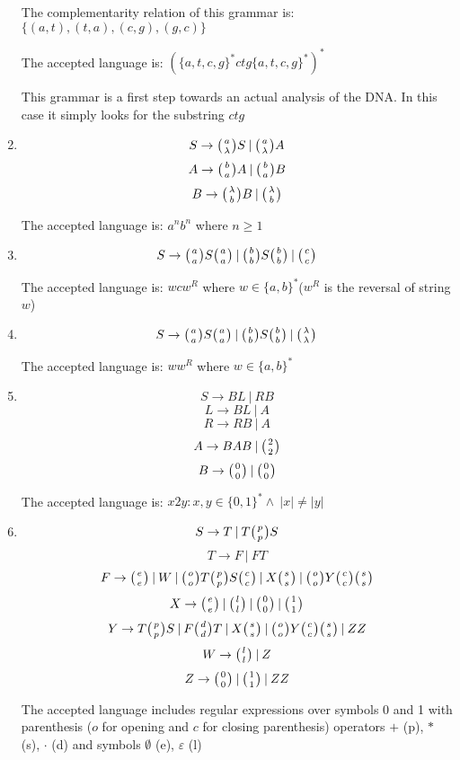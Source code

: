 \begin{enumerate}
{    The complementarity relation of this grammar is: $\{(a, t), (t, a), (c, g), (g, c)\}$

    The accepted language is: $(\{a,t,c,g\}^*ctg\{a,t,c,g\}^*)^*$

    This grammar is a first step towards an actual analysis of the DNA. In this case it simply looks for the substring $ctg$
  }

  \item{
    $$S \rightarrow \wkpair{a}{\lambda} S \:|\: \wkpair{a}{\lambda} A$$
    $$A \rightarrow \wkpair{b}{a} A \:|\: \wkpair{b}{a} B$$
    $$B \rightarrow \wkpair{\lambda}{b} B \:|\: \wkpair{\lambda}{b}$$


    The accepted language is: $a^nb^n$ where $n \geq 1$
  }

  \item{
    $$S \rightarrow \wkpair{a}{a} S \wkpair{a}{a} \:|\: \wkpair{b}{b} S \wkpair{b}{b} \:|\: \wkpair{c}{c}$$

    The accepted language is: $wcw^R$ where $w \in \{a, b\}^*$($w^R$ is the reversal of string $w$)
  }

  \item{
    $$S \rightarrow \wkpair{a}{a} S \wkpair{a}{a} \:|\: \wkpair{b}{b} S \wkpair{b}{b} \:|\: \wkpair{\lambda}{\lambda}$$

    The accepted language is: $ww^R$ where $w \in \{a, b\}^*$
  }

  \item{
    $$S \rightarrow B L \:|\: R B$$
    $$L \rightarrow B L \:|\: A$$
    $$R \rightarrow R B \:|\: A$$
    $$A \rightarrow B A B \:|\: \wkpair{2}{2}$$
    $$B \rightarrow \wkpair{0}{0} \:|\: \wkpair{0}{0}$$

    The accepted language is: $x2y: x, y \in \{0,1\}^* \wedge \:|x| \neq |y|$
  }

  \item{
    $$S \rightarrow T \:|\: T \wkpair{p}{p} S$$
    $$T \rightarrow F \:|\: F T$$
    $$F \rightarrow \wkpair{e}{e} \:|\: W \:|\: \wkpair{o}{o} T \wkpair{p}{p} S \wkpair{c}{c} \:|\: X \wkpair{s}{s} \:|\: \wkpair{o}{o} Y \wkpair{c}{c} \wkpair{s}{s}$$
    $$X \rightarrow \wkpair{e}{e} \:|\: \wkpair{l}{l} \:|\: \wkpair{0}{0} \:|\: \wkpair{1}{1}$$
    $$Y \rightarrow T \wkpair{p}{p} S \:|\: F \wkpair{d}{d} T \:|\: X \wkpair{s}{s} \:|\: \wkpair{o}{o} Y \wkpair{c}{c} \wkpair{s}{s} \:|\: Z Z$$
    $$W \rightarrow \wkpair{l}{l} \:|\: Z$$
    $$Z \rightarrow \wkpair{0}{0} \:|\: \wkpair{1}{1} \:|\: Z Z$$

    The accepted language includes regular expressions over symbols 0 and 1 with parenthesis ($o$ for opening and $c$ for closing parenthesis) operators $+$ (p), $*$ (s), $\cdot$ (d) and symbols $\emptyset$ (e), $\varepsilon$ (l)
  }


\end{enumerate}

